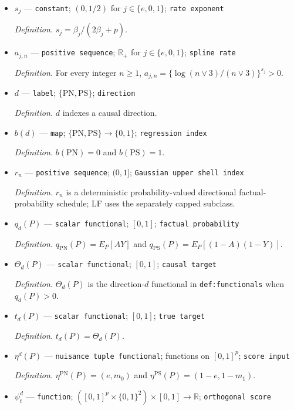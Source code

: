 \documentclass{article}
\begin{document}
\begin{itemize}
  \item \(s_j\) --- \texttt{constant}; \((0,1/2)\) for \(j\in\{e,0,1\}\); \texttt{rate exponent}
  \par\smallskip\noindent\emph{Definition.} \(s_j=\beta_j/(2\beta_j+p)\).
  \item \(a_{j,n}\) --- \texttt{positive sequence}; \(\mathbb R_+\) for \(j\in\{e,0,1\}\); \texttt{spline rate}
  \par\smallskip\noindent\emph{Definition.} For every integer \(n\ge1\), \(a_{j,n}=\{\log(n\vee3)/(n\vee3)\}^{s_j}>0\).
  \item \(d\) --- \texttt{label}; \(\{\mathrm{PN},\mathrm{PS}\}\); \texttt{direction}
  \par\smallskip\noindent\emph{Definition.} \(d\) indexes a causal direction.
  \item \(b(d)\) --- \texttt{map}; \(\{\mathrm{PN},\mathrm{PS}\}\to\{0,1\}\); \texttt{regression index}
  \par\smallskip\noindent\emph{Definition.} \(b(\mathrm{PN})=0\) and \(b(\mathrm{PS})=1\).
  \item \(r_n\) --- \texttt{positive sequence}; \((0,1]\); \texttt{Gaussian upper shell index}
  \par\smallskip\noindent\emph{Definition.} \(r_n\) is a deterministic probability-valued directional factual-probability schedule; LF uses the separately capped subclass.
  \item \(q_d(P)\) --- \texttt{scalar functional}; \([0,1]\); \texttt{factual probability}
  \par\smallskip\noindent\emph{Definition.} \(q_{\mathrm{PN}}(P)=E_P[AY]\) and \(q_{\mathrm{PS}}(P)=E_P[(1-A)(1-Y)]\).
  \item \(\Theta_d(P)\) --- \texttt{scalar functional}; \([0,1]\); \texttt{causal target}
  \par\smallskip\noindent\emph{Definition.} \(\Theta_d(P)\) is the direction-\(d\) functional in \texttt{def:functionals} when \(q_d(P)>0\).
  \item \(t_d(P)\) --- \texttt{scalar functional}; \([0,1]\); \texttt{true target}
  \par\smallskip\noindent\emph{Definition.} \(t_d(P)=\Theta_d(P)\).
  \item \(\eta^d(P)\) --- \texttt{nuisance tuple functional}; functions on \([0,1]^p\); \texttt{score input}
  \par\smallskip\noindent\emph{Definition.} \(\eta^{\mathrm{PN}}(P)=(e,m_0)\) and \(\eta^{\mathrm{PS}}(P)=(1-e,1-m_1)\).
  \item \(\psi_t^d\) --- \texttt{function}; \(([0,1]^p\times\{0,1\}^2)\times[0,1]\to\mathbb R\); \texttt{orthogonal score}

\end{itemize}
\end{document}
